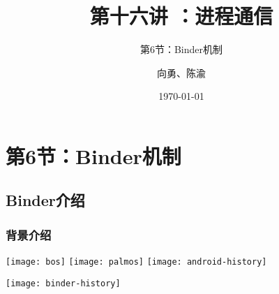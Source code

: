 


\title[第16讲]{第十六讲 ：进程通信} %
\subtitle{第6节：Binder机制}
\author{向勇、陈渝} %
\date{\today} %



\begin{frame}
\titlepage %
\end{frame}

%
\section{第6节：Binder机制} %
\subsection{Binder介绍} %
\begin{frame}[plain]
	\frametitle{背景介绍}
	\centering
	\texttt{[image: bos]}
	\texttt{[image: palmos]}
	\texttt{[image: android-history]}

	\texttt{[image: binder-history]}
\end{frame}

